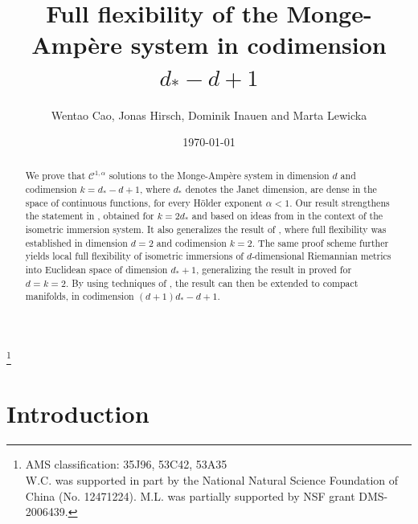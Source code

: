 \documentclass[reqno,twoside,11pt]{amsart}
\numberwithin{equation}{section}
\theoremstyle{plain}
\theoremstyle{definition}
\begin{document}
\title [The Monge-Amp\`ere system in codimension $d_*-d+1$]
{Full flexibility of the Monge-Amp\`ere system in 
  codimension $d_*-d+1$}
\author{Wentao Cao, Jonas Hirsch, Dominik Inauen and Marta Lewicka}
\address{W.C.: Academy for Multidisciplinary Studies, Capital Normal University, West 3rd Ring North Road 105, Beijing, 100048 P.R. China}
\address{J.H.: Institut f\"{u}r Mathematik, Universit\"{a}t Leipzig, D-04109, Leipzig, Germany}
\address{D.I.: Universit\'e de Fribourg, CH-1700, Fribourg, Switzerland}
\address{M.L.: University of Pittsburgh, Department of Mathematics, 
139 University Place, Pittsburgh, PA 15260, USA}

\date{\today}
\thanks{AMS classification: 35J96, 53C42, 53A35\\
W.C. was supported in part by the National Natural Science Foundation of China (No. 12471224). 
M.L. was partially supported by NSF grant DMS-2006439.
}

\begin{abstract} 
We prove that $\mathcal{C}^{1,\alpha}$ solutions to the Monge-Amp\`ere
system in dimension $d$ and codimension $k= d_*-d+1$, where
$d_*$ denotes the Janet dimension, are dense in the space
of continuous functions, for every H\"older exponent $\alpha<1$.
Our result strengthens the statement in \cite{lew_conv}, obtained for
$k = 2d_*$ and based on ideas from \cite{Kallen} in the context of the
isometric immersion system. It also generalizes the result of
\cite{in_lew2}, where full flexibility was established in dimension
$d=2$ and codimension $k=2$.
The same proof scheme further yields local full flexibility of
isometric immersions of $d$-dimensional Riemannian metrics into
Euclidean space of dimension $d_* + 1$, generalizing the result in
\cite{lew_full2d2k} proved for $d=k=2$. By using techniques of \cite{CDS}, the result can then be extended to compact manifolds, in codimension $(d+1)d_*-d+1$. 
\end{abstract}

\maketitle

\section{Introduction}\label{sec_intro}
\end{document}
